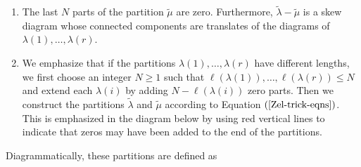 \begin{rema} 
\begin{enumerate}
\item The last $N$ parts of the partition $\widetilde{\mu}$ are zero. Furthermore, $\widetilde{\lambda}- \widetilde{\mu}$ is a skew diagram whose connected components are translates of the diagrams of $\lambda(1),\ldots, \lambda(r)$. 


\item We emphasize that if the partitions $\lambda(1), \ldots, \lambda(r)$ have different lengths, we first choose an integer $N \geq 1$ such that $\ell(\lambda(1)), \ldots, \ell(\lambda(r)) \leq N$ and extend each $\lambda(i)$ by adding $N-\ell(\lambda(i))$ zero parts. Then we construct the partitions $\widetilde{\lambda}$ and $\widetilde{\mu}$ according to Equation $(\ref{Zel-trick-eqns})$. This is emphasized in the diagram below by using red vertical lines to indicate that zeros may have been added to the end of the partitions.
\end{enumerate}
\end{rema}
Diagrammatically, these partitions are defined as 
